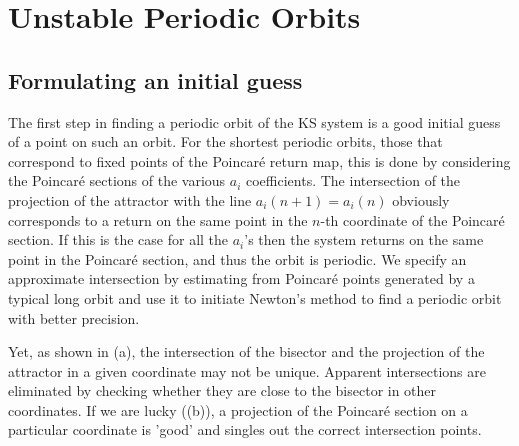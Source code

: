 \documentclass[pre,preprint,groupedaddress,showpacs,showkeys]{revtex4}
\begin{document}



\section{Unstable Periodic Orbits}

 \subsection{Formulating an initial guess}

  The first step in finding a periodic orbit of the KS system is
  a good initial guess of a point on such an
  orbit. For the shortest periodic orbits, those that correspond to
  fixed points of the Poincar\'e return map, this is done by considering the Poincar\'e sections of the various
  $a_i$ coefficients. The intersection of the projection of the attractor with
  the line $a_i(n+1)=a_i(n)$ obviously corresponds to a return on the same point
  in the $n$-th coordinate of the Poincar\'e section. If this is the case for all the $a_i$'s then the
  system returns on the same point in the Poincar\'e section, and thus the orbit is
  periodic. We specify an approximate intersection by estimating from Poincar\'e points
  generated by a typical long orbit and use it to initiate Newton's method to find a
  periodic orbit with better precision.

  Yet, as shown in (a), the intersection of the bisector and
  the projection of the attractor in a given coordinate may not be unique.
  Apparent intersections are eliminated by checking whether they are close to the
  bisector in other coordinates. If we are lucky ((b)), a projection of the
  Poincar\'e section on a particular coordinate is 'good' and singles out the correct intersection
  points.
\end{document}
